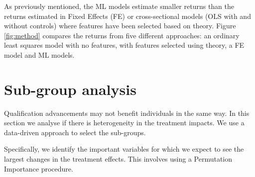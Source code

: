 \documentclass[12pt, a4paper]{article}
\begin{document}
As previously mentioned, the ML models estimate smaller returns than the returns estimated in Fixed Effects (FE) or cross-sectional models (OLS with and without controls) where features have been selected based on theory. Figure \ref{fig:method} compares the returns from five different approaches: an ordinary least squares model with no features, with features selected using theory, a FE model and ML models.

%

\section{Sub-group analysis}

Qualification advancements may not benefit individuals in the same way. In this section we analyse if there is heterogeneity in the treatment impacts. We use a data-driven approach to select the sub-groups.  
%
%


Specifically, we identify the important variables for which we expect to see the largest changes in the treatment effects. This involves using a Permutation Importance procedure.


\end{document}
